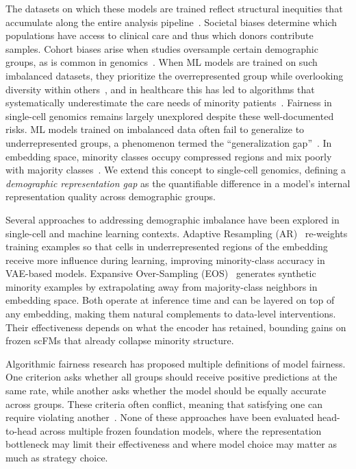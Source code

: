 \documentclass[sigconf]{acmart}
\begin{document}
The datasets on which these models are trained reflect structural inequities that accumulate along the entire analysis pipeline~\cite{willem2025bias}. Societal biases determine which populations have access to clinical care and thus which donors contribute samples. Cohort biases arise when studies oversample certain demographic groups, as is common in genomics~\cite{popejoy2016genomics}. When ML models are trained on such imbalanced datasets, they prioritize the overrepresented group while overlooking diversity within others~\cite{willem2025bias}, and in healthcare this has led to algorithms that systematically underestimate the care needs of minority patients~\cite{obermeyer2019dissecting}. Fairness in single-cell genomics remains largely unexplored despite these well-documented risks. ML models trained on imbalanced data often fail to generalize to underrepresented groups, a phenomenon termed the ``generalization gap''~\cite{das2022efficient,arpit2017memorization}. In embedding space, minority classes occupy compressed regions and mix poorly with majority classes~\cite{dablain2022efficient}. We extend this concept to single-cell genomics, defining a \textit{demographic representation gap} as the quantifiable difference in a model's internal representation quality across demographic groups.

Several approaches to addressing demographic imbalance have been explored in single-cell and machine learning contexts. Adaptive Resampling (AR)~\cite{navidi2025adaptive} re-weights training examples so that cells in underrepresented regions of the embedding receive more influence during learning, improving minority-class accuracy in VAE-based models. Expansive Over-Sampling (EOS)~\cite{dablain2022efficient} generates synthetic minority examples by extrapolating away from majority-class neighbors in embedding space. Both operate at inference time and can be layered on top of any embedding, making them natural complements to data-level interventions. Their effectiveness depends on what the encoder has retained, bounding gains on frozen scFMs that already collapse minority structure.

Algorithmic fairness research has proposed multiple definitions of model fairness. One criterion asks whether all groups should receive positive predictions at the same rate, while another asks whether the model should be equally accurate across groups. These criteria often conflict, meaning that satisfying one can require violating another~\cite{hardt2016equality,chouldechova2017fair,kleinberg2016inherent}. None of these approaches have been evaluated head-to-head across multiple frozen foundation models, where the representation bottleneck may limit their effectiveness and where model choice may matter as much as strategy choice.
\end{document}
